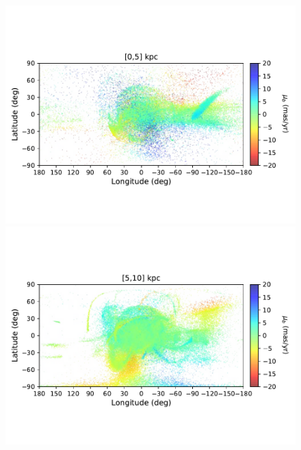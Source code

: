 \begin{figure}[h!]
\begin{center}
            \includegraphics[clip=true, trim = 0mm 20mm 0mm 20mm, width=0.9\columnwidth]{images/PII_ensemble_LB_D0-5_PMB_new.pdf}
            \includegraphics[clip=true, trim = 0mm 20mm 0mm 20mm, width=0.9\columnwidth]{images/PII_ensemble_LB_D5-10_PMB_new.pdf}


\end{center}
\end{figure}

